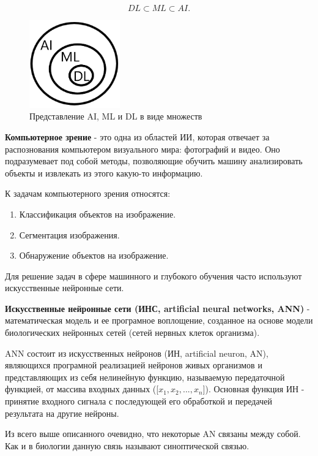 \documentclass[bachelor, och, coursework]{shiza}
\begin{document}
\begin{equation}
    DL \subset ML \subset AI. 
\end{equation}

\begin{figure}[H]
    \centering
    \includegraphics[width=0.35\textwidth]{2}
    \caption{Представление AI, ML и DL в виде множеств}
    \label{fig:img1}
\end{figure}

\textbf{Компьютерное зрение} - это одна из областей ИИ, которая отвечает за распознования компьютером визуального мира: фотографий и видео.
Оно подразумевает под собой методы, позволяющие обучить машину анализировать объекты и извлекать из этого какую-то информацию.

К задачам компьютерного зрения относятся:

\begin{enumerate}
    \item Классификация объектов на изображение.
    \item Сегментация изображения.
    \item Обнаружение объектов на изображение.
\end{enumerate}

Для решение задач в сфере машинного и глубокого обучения часто используют искусственные нейронные сети.

\textbf{Искусственные нейронные сети (ИНС, artificial neural networks, ANN)} - математическая модель и ее програмное воплощение, созданное
на основе модели биологических нейронных сетей (сетей нервных клеток организма).

ANN состоит из искусственных нейронов (ИН, artificial neuron, AN), являющихся програмной реализацией нейронов живых организмов и представляющих
из себя нелинейную функцию, называемую передаточной функцией, от массива входных данных ([$x_1, x_2, ..., x_n$]). Основная функция ИН - принятие 
входного сигнала с последующей его обработкой и передачей результата на другие нейроны.

Из всего выше описанного очевидно, что некоторые AN связаны между собой. Как и в биологии данную связь называют синоптической связью.
\end{document}
